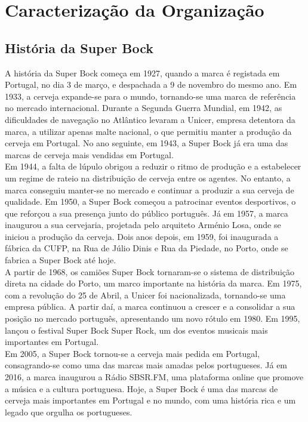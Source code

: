 \chapter{Caracterização da Organização}
\label{Chapter1} %

\section{História da Super Bock}
A história da Super Bock começa em 1927, quando a marca é registada em Portugal, no dia 3 de março, e despachada a 9 de novembro do mesmo ano. Em 1933, a cerveja expande-se para o mundo, tornando-se uma marca de referência no mercado internacional. Durante a Segunda Guerra Mundial, em 1942, as dificuldades de navegação no Atlântico levaram a Unicer, empresa detentora da marca, a utilizar apenas malte nacional, o que permitiu manter a produção da cerveja em Portugal. No ano seguinte, em 1943, a Super Bock já era uma das marcas de cerveja mais vendidas em Portugal.\\

Em 1944, a falta de lúpulo obrigou a reduzir o ritmo de produção e a estabelecer um regime de rateio na distribuição de cerveja entre os agentes. No entanto, a marca conseguiu manter-se no mercado e continuar a produzir a sua cerveja de qualidade. Em 1950, a Super Bock começou a patrocinar eventos desportivos, o que reforçou a sua presença junto do público português. Já em 1957, a marca inaugurou a sua cervejaria, projetada pelo arquiteto Arménio Losa, onde se iniciou a produção da cerveja. Dois anos depois, em 1959, foi inaugurada a fábrica da CUFP, na Rua de Júlio Dinis e Rua da Piedade, no Porto, onde se fabrica a Super Bock até hoje.\\

A partir de 1968, os camiões Super Bock tornaram-se o sistema de distribuição direta na cidade do Porto, um marco importante na história da marca. Em 1975, com a revolução do 25 de Abril, a Unicer foi nacionalizada, tornando-se uma empresa pública. A partir daí, a marca continuou a crescer e a consolidar a sua posição no mercado português, apresentando um novo rótulo em 1980. Em 1995, lançou o festival Super Bock Super Rock, um dos eventos musicais mais importantes em Portugal.\\

Em 2005, a Super Bock tornou-se a cerveja mais pedida em Portugal, consagrando-se como uma das marcas mais amadas pelos portugueses. Já em 2016, a marca inaugurou a Rádio SBSR.FM, uma plataforma online que promove a música e a cultura portuguesa. Hoje, a Super Bock é uma das marcas de cerveja mais importantes em Portugal e no mundo, com uma história rica e um legado que orgulha os portugueses.\\



